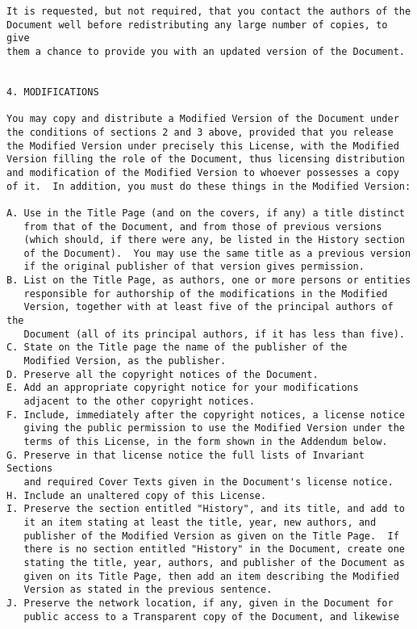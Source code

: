\documentclass[12pt]{article}
\begin{document}
\begin{verbatim}
It is requested, but not required, that you contact the authors of the
Document well before redistributing any large number of copies, to give
them a chance to provide you with an updated version of the Document.


4. MODIFICATIONS

You may copy and distribute a Modified Version of the Document under
the conditions of sections 2 and 3 above, provided that you release
the Modified Version under precisely this License, with the Modified
Version filling the role of the Document, thus licensing distribution
and modification of the Modified Version to whoever possesses a copy
of it.  In addition, you must do these things in the Modified Version:

A. Use in the Title Page (and on the covers, if any) a title distinct
   from that of the Document, and from those of previous versions
   (which should, if there were any, be listed in the History section
   of the Document).  You may use the same title as a previous version
   if the original publisher of that version gives permission.
B. List on the Title Page, as authors, one or more persons or entities
   responsible for authorship of the modifications in the Modified
   Version, together with at least five of the principal authors of the
   Document (all of its principal authors, if it has less than five).
C. State on the Title page the name of the publisher of the
   Modified Version, as the publisher.
D. Preserve all the copyright notices of the Document.
E. Add an appropriate copyright notice for your modifications
   adjacent to the other copyright notices.
F. Include, immediately after the copyright notices, a license notice
   giving the public permission to use the Modified Version under the
   terms of this License, in the form shown in the Addendum below.
G. Preserve in that license notice the full lists of Invariant Sections
   and required Cover Texts given in the Document's license notice.
H. Include an unaltered copy of this License.
I. Preserve the section entitled "History", and its title, and add to
   it an item stating at least the title, year, new authors, and
   publisher of the Modified Version as given on the Title Page.  If
   there is no section entitled "History" in the Document, create one
   stating the title, year, authors, and publisher of the Document as
   given on its Title Page, then add an item describing the Modified
   Version as stated in the previous sentence.
J. Preserve the network location, if any, given in the Document for
   public access to a Transparent copy of the Document, and likewise

\end{verbatim}
\end{document}
